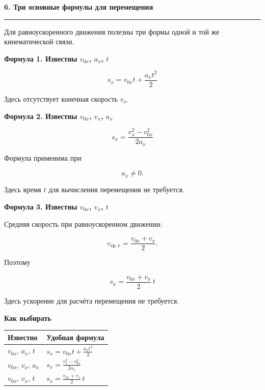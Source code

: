 \documentclass[a4paper,12pt]{article}
\newcommand{\sectiontitle}[1]{%
  \vspace{2mm}
  {\Large\bfseries\color{darkaccent}#1}\par
  \vspace{1mm}
  {\color{accent}\rule{\linewidth}{0.5pt}}
  \vspace{3mm}
}
\newcommand{\subsectiontitle}[1]{%
  \vspace{2mm}
  {\large\bfseries\color{darkaccent}#1}\par
  \vspace{1mm}
}
\begin{document}
\clearpage

\sectiontitle{6. Три основные формулы для перемещения}

Для равноускоренного движения полезны три формы одной и той же кинематической связи.

\subsectiontitle{Формула 1. Известны \(v_{0x}\), \(a_x\), \(t\)}

\[
\boxed{
s_x=v_{0x}t+\frac{a_xt^2}{2}
}
\]

Здесь отсутствует конечная скорость \(v_x\).

\subsectiontitle{Формула 2. Известны \(v_{0x}\), \(v_x\), \(a_x\)}

\[
\boxed{
s_x=\frac{v_x^2-v_{0x}^2}{2a_x}
}
\]

Формула применима при

\[
a_x\ne0.
\]

Здесь время \(t\) для вычисления перемещения не требуется.

\subsectiontitle{Формула 3. Известны \(v_{0x}\), \(v_x\), \(t\)}

Средняя скорость при равноускоренном движении:

\[
v_{\text{ср},x}
=
\frac{v_{0x}+v_x}{2}.
\]

Поэтому

\[
\boxed{
s_x=
\frac{v_{0x}+v_x}{2}\,t
}
\]

Здесь ускорение для расчёта перемещения не требуется.

\subsectiontitle{Как выбирать}

\begin{center}
\begin{tabularx}{\linewidth}{@{}X X@{}}
\toprule
\textbf{Известно} & \textbf{Удобная формула} \\
\midrule

\(v_{0x},\,a_x,\,t\)
&
\(\displaystyle
s_x=v_{0x}t+\frac{a_xt^2}{2}
\)
\\[3mm]

\(v_{0x},\,v_x,\,a_x\)
&
\(\displaystyle
s_x=\frac{v_x^2-v_{0x}^2}{2a_x}
\)
\\[3mm]

\(v_{0x},\,v_x,\,t\)
&
\(\displaystyle
s_x=\frac{v_{0x}+v_x}{2}\,t
\)
\\

\bottomrule
\end{tabularx}
\end{center}
\end{document}
